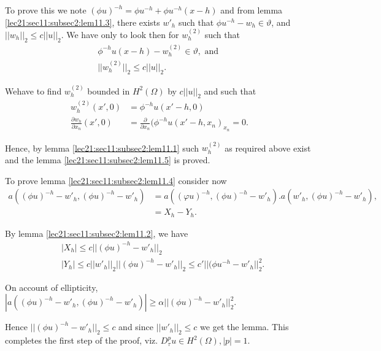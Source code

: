 To prove this we note $(\phi u )^{-h} = \phi u^{-h} + \phi u^{-h}
(x-h)$ and from lemma \ref{lec21:sec11:subsec2:lem11.3}, there exists $w'_h$ such that $\phi
u^{-h} - w_h \in \vartheta$, and $|| w_h ||_2 \leq c || u
||_2$. We have only to look then for $w^{(2)}_h$ such that 
\begin{gather*}
\phi^{-h } u(x-h) - w^{(2)}_h \in \vartheta, \text { and }\\
|| w_h^{(2)} ||_2 \leq c || u ||_2. 
\end{gather*}

We\pageoriginale have to find $w^{(2)}_h$ bounded in $H^2 (\Omega)$ by $c || u ||_2$
and such that 
\begin{align*}
  w^{(2)}_h (x' , 0) & = \phi^{-h} u(x' - h, 0)\\
  \frac{\partial w_h}{\partial x_n}(x' , 0) & = \frac{\partial}{\partial
    x_n} (\phi^{-h} u(x' - h, x_n)_{x_n} = 0.  
\end{align*}

Hence, by lemma \ref{lec21:sec11:subsec2:lem11.1} such $w^{(2)}_h$ as required above exist and
the lemma \ref{lec21:sec11:subsec2:lem11.5} is proved.  

To prove lemma \ref{lec21:sec11:subsec2:lem11.4} consider now
\begin{align*}
  a((\phi u)^{-h} - w'_h, (\phi u)^{-h} - w' _h) & = a((\varphi u)^{-h},
  (\phi u)^{-h} - w'_h). a(w'_h, (\phi u)^{-h} - w'_h), \\ 
  & = X_h - Y_h. 
\end{align*}

By lemma \ref{lec21:sec11:subsec2:lem11.2}, we have
\begin{align*}
  & | X_h | \leq c || (\phi u)^{-h} - w'_h ||_2\\
  & | Y_h | \leq c || w'_h ||_2 || (\phi u)^{-h} - w'_h ||_2 \leq c' ||
  (\phi u^{-h} - w'_h ||^2_2.  
\end{align*}

On account of ellipticity, $|a((\phi u)^{-h} - w'_h, (\phi u )^{-h } -
w'_h)| \geq \alpha || (\phi u)^{-h} - w'_h ||^2_2$.  

Hence $|| (\phi u)^{-h} -w'_h ||_2 \leq c$ and since $|| w'_h ||_2
\leq c$ we get the lemma. This completes the first step of the proof,
viz. $D^p_\tau u \in H^2 (\Omega), |p| = 1$.  
